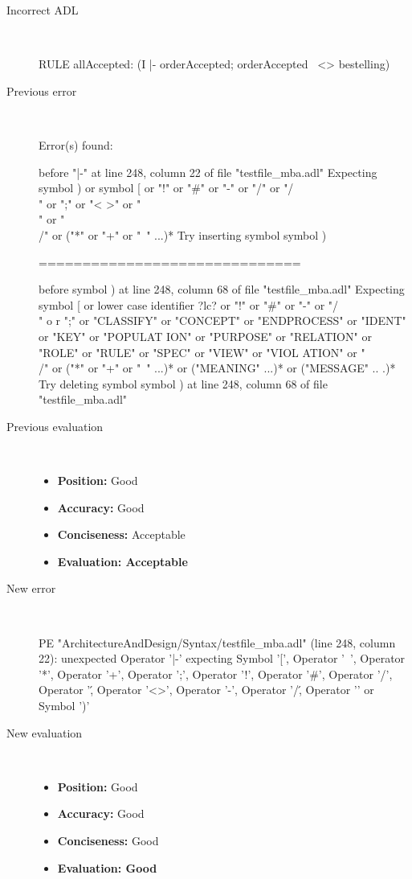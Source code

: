 \hrulefill

\begin{description}
  \item[Incorrect ADL]~\\
\begin{adl}
RULE allAccepted: (I |- orderAccepted; orderAccepted~ <> bestelling) \end{adl}
  \item[Previous error]~\\
\begin{haskell}
Error(s) found:

before "|-" at line 248, column 22 of file "testfile_mba.adl"
Expecting symbol ) or symbol [ or "!" or "#" or "-" or "/" or "/\\" or ";" or "<
>" or "\\" or "\\/" or ("*" or "+" or "~" ...)*
Try inserting symbol symbol )

==============================

before symbol ) at line 248, column 68 of file "testfile_mba.adl"
Expecting symbol [ or lower case identifier ?lc? or "!" or "#" or "-" or "/\\" o
r ";" or "CLASSIFY" or "CONCEPT" or "ENDPROCESS" or "IDENT" or "KEY" or "POPULAT
ION" or "PURPOSE" or "RELATION" or "ROLE" or "RULE" or "SPEC" or "VIEW" or "VIOL
ATION" or "\\/" or ("*" or "+" or "~" ...)* or ("MEANING" ...)* or ("MESSAGE" ..
.)*
Try deleting symbol symbol ) at line 248, column 68 of file "testfile_mba.adl"
\end{haskell}
  \item[Previous evaluation]~\\
    \begin{itemize}
    \item \textbf{Position:} Good
    \item \textbf{Accuracy:} Good
    \item \textbf{Conciseness:} Acceptable
    \item \textbf{Evaluation: Acceptable}
    \end{itemize}
  \item[New error]~\\
\begin{haskell}
PE "ArchitectureAndDesign/Syntax/testfile_mba.adl" (line 248, column 22):
unexpected Operator '|-'
expecting Symbol '[', Operator '~', Operator '*', Operator '+', Operator ';', Operator '!', Operator '#', Operator '/', Operator '\', Operator '<>', Operator '-', Operator '/\', Operator '\/' or Symbol ')'\end{haskell}
  \item[New evaluation]~\\
    \begin{itemize}
    \item \textbf{Position:} Good
    \item \textbf{Accuracy:} Good
    \item \textbf{Conciseness:} Good
    \item \textbf{Evaluation: Good}
    \end{itemize}
  \end{description}

